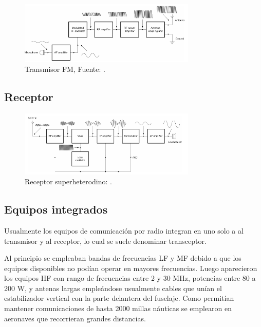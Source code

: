 \begin{figure}[!htb]
  \centering
  \includegraphics[width=0.75\textwidth]{09.sintesis.comunicaciones.a.bordo/Imagenes.U09/transmisor_fm.png}
  \caption{Transmisor FM, Fuente: \protect\cite{Tooley_Aircraft_communications_and_navigation_systems}.}
  \label{fig:FM_transmision}
\end{figure}


\subsection{Receptor}
\label{sec:09.01.03.receptor}



\begin{figure}[!h]
  \centering
  \includegraphics[width=0.75\textwidth]{09.sintesis.comunicaciones.a.bordo/Imagenes.U09/receptor_superheterodino.png}
  \caption{Receptor superheterodino: \protect\cite{Tooley_Aircraft_communications_and_navigation_systems}.}
  \label{fig:receptor.superheterodino}
\end{figure}

\subsection{Equipos integrados}
\label{sec:09.01.04.equipos.integrados}

Usualmente los equipos de comunicaci\'on por radio integran en uno solo a al transmisor y al receptor, lo cual se suele denominar transceptor.

Al principio se empleaban bandas de frecuencias  LF y MF debido a que los equipos disponibles no pod\'ian operar en mayores frecuencias. Luego aparecieron los equipos HF con rango de frecuencias entre 2 y 30 MHz, potencias entre 80 a 200 W, y antenas largas emple\'andose usualmente cables que un\'ian el estabilizador vertical con la parte delantera del fuselaje. Como permit\'ian mantener comunicaciones de hasta 2000 millas n\'auticas se emplearon en aeronaves que recorrieran grandes distancias.

